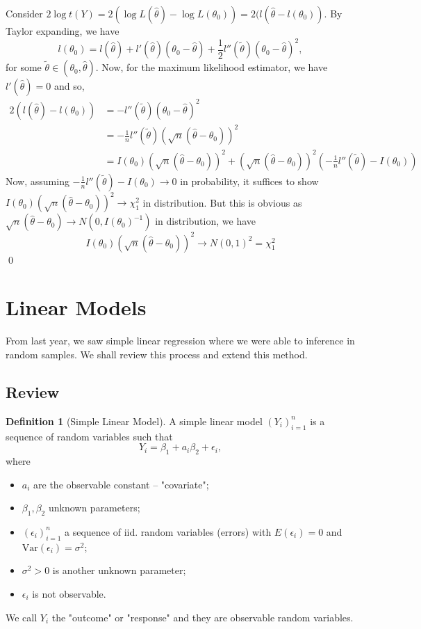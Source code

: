 \documentclass[
]{article}
\theoremstyle{definition}
\theoremstyle{definition}
\newtheorem{definition}{Definition}[section]
\begin{document}
Consider
\(2\log t(Y) = 2 (\log L(\hat{\theta}) - \log L(\theta_0)) =  2(l(\hat{\theta} - l(\theta_0))\).
By Taylor expanding, we have
\[l(\theta_0) = l(\hat{\theta}) + l'(\hat{\theta})(\theta_0 - \hat{\theta}) + 
    \frac{1}{2} l''(\tilde{\theta})(\theta_0 - \hat{\theta})^2,\] for
some \(\tilde \theta \in (\theta_0, \hat{\theta})\). Now, for the
maximum likelihood estimator, we have \(l'(\hat{\theta}) = 0\) and so,
\[\begin{split}
    2(l(\hat{\theta}) - l(\theta_0)) & = -l''(\tilde{\theta})(\theta_0 - \hat{\theta})^2 \\
    & = - \frac{1}{n}l''(\tilde \theta)(\sqrt{n}(\hat{\theta} - \theta_0))^2\\
    & = I(\theta_0)(\sqrt{n}(\hat{\theta} - \theta_0))^2 +
      (\sqrt{n}(\hat{\theta} - \theta_0))^2\left(-\frac{1}{n}l''(\tilde \theta) - I(\theta_0)\right)
  \end{split}\] Now, assuming
\(-\frac{1}{n}l''(\tilde \theta) - I(\theta_0) \to 0\) in probability,
it suffices to show
\(I(\theta_0)(\sqrt{n}(\hat{\theta} - \theta_0))^2 \to \chi_1^2\) in
distribution. But this is obvious as
\(\sqrt{n}(\hat\theta - \theta_0) \to N(0, I(\theta_0)^{-1})\) in
distribution, we have
\[I(\theta_0)(\sqrt{n}(\hat{\theta} - \theta_0))^2 \to N(0, 1)^2 = \chi_1^2\]
\qed

\newpage

\hypertarget{linear-models}{%
\section{Linear Models}\label{linear-models}}

From last year, we saw simple linear regression where we were able to
inference in random samples. We shall review this process and extend
this method.

\hypertarget{review-1}{%
\subsection{Review}\label{review-1}}

\begin{definition}[Simple Linear Model]
  A simple linear model \((Y_i)_{i = 1}^n\) is a sequence of random variables such that 
  \[Y_i = \beta_1 + a_i \beta_2 + \epsilon_i,\]
  where 
  \begin{itemize}
    \item \(a_i\) are the observable constant -- "covariate";
    \item \(\beta_1, \beta_2\) unknown parameters;
    \item \((\epsilon_i)_{i = 1}^n\) a sequence of iid. random variables (errors)
      with \(E(\epsilon_i) = 0\) and \(\text{Var}(\epsilon_i) = \sigma^2\);
    \item \(\sigma^2 > 0\) is another unknown parameter;
    \item \(\epsilon_i\) is not observable.
  \end{itemize}
  We call \(Y_i\) the "outcome" or "response" and they are observable random 
  variables.
\end{definition}
\end{document}
